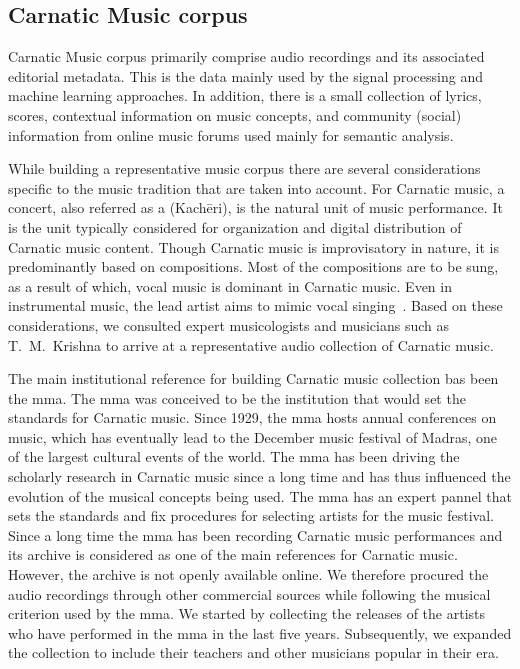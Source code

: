 \subsection{Carnatic Music corpus}
\label{sec:corpus_carnatic_music_corpus}

Carnatic Music corpus primarily comprise audio recordings and its associated editorial metadata. This is the data mainly used by the signal processing and machine learning approaches. In addition, there is a small collection of lyrics, scores, contextual information on music concepts, and community (social) information from online music forums used mainly for semantic analysis. 

While building a representative music corpus there are several considerations specific to the music tradition that are taken into account. For Carnatic music, a concert, also referred as a (Kach\={e}ri), is the natural unit of music performance. It is the unit typically considered for organization and digital distribution of Carnatic music content. Though Carnatic music is improvisatory in nature, it is predominantly based on compositions. Most of the compositions are to be sung, as a result of which, vocal music is dominant in Carnatic music. Even in instrumental music, the lead artist aims to mimic vocal singing~\citep{Viswanathan2004}. Based on these considerations, we consulted expert musicologists and musicians such as T.~M.~Krishna to arrive at a representative audio collection of Carnatic music.

The main institutional reference for building Carnatic music collection bas been the \gls{mma}. The \Gls{mma} was conceived to be the institution that would set the standards for Carnatic music. Since 1929, the \Gls{mma} hosts annual conferences on music, which has eventually lead to the December music festival of Madras, one of the largest cultural events of the world. The \gls{mma} has been driving the scholarly research in Carnatic music since a long time and has thus influenced the evolution of the musical concepts being used. The \gls{mma} has an expert pannel that sets the standards and fix procedures for selecting artists for the music festival. Since a long time the \gls{mma} has been recording Carnatic music performances and its archive is considered as one of the main references for Carnatic music. However, the archive is not openly available online. We therefore procured the audio recordings through other commercial sources while following the musical criterion used by the \gls{mma}. We started by collecting the releases of the artists who have performed in the \gls{mma} in the last five years. Subsequently, we expanded the collection to include their teachers and other musicians popular in their era. 

